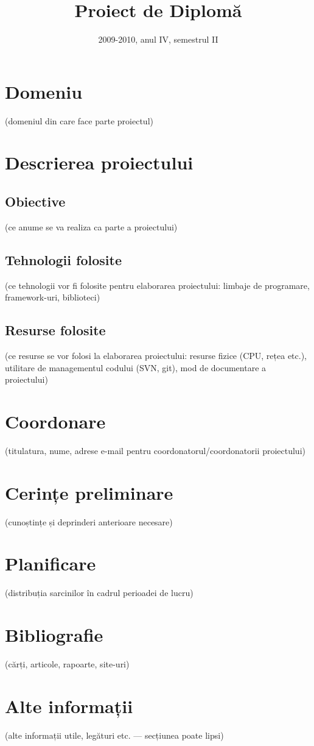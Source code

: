 \documentclass{proplic.cs.pub.ro}
\title{Proiect de Diplomă} %
\subtitle{2009-2010, anul IV, semestrul II}
\begin{document}
\maketitle

\section{Domeniu}

(domeniul din care face parte proiectul)

\section{Descrierea proiectului}

\subsection{Obiective}

(ce anume se va realiza ca parte a proiectului)

\subsection{Tehnologii folosite}

(ce tehnologii vor fi folosite pentru elaborarea proiectului: limbaje de
programare, framework-uri, biblioteci)

\subsection{Resurse folosite}

(ce resurse se vor folosi la elaborarea proiectului: resurse fizice
(CPU, rețea etc.), utilitare de managementul codului (SVN, git), mod de
documentare a proiectului)

\section{Coordonare}

(titulatura, nume, adrese e-mail pentru coordonatorul/coordonatorii
proiectului)

\section{Cerințe preliminare}

(cunoștințe și deprinderi anterioare necesare)

\section{Planificare}

(distribuția sarcinilor în cadrul perioadei de lucru)

\section{Bibliografie}

(cărți, articole, rapoarte, site-uri)

\section{Alte informații}

(alte informații utile, legături etc. --- secțiunea poate lipsi)
\end{document}
